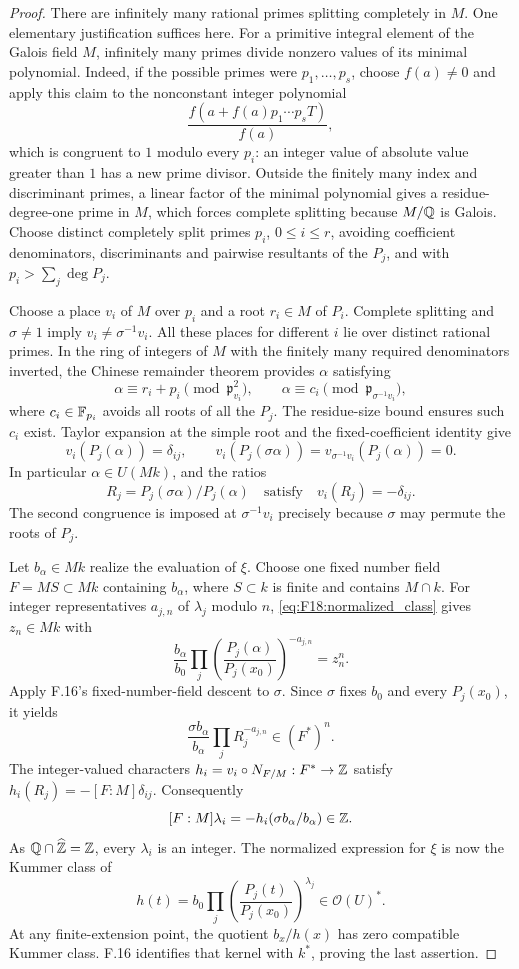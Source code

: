 \begin{proof}
There are infinitely many rational primes splitting completely
in $M$. One elementary justification suffices here. For a primitive
integral element of the Galois field $M$, infinitely many primes
divide nonzero values of its minimal polynomial. Indeed, if the
possible primes were $p_1,\ldots,p_s$, choose $f(a)\ne0$ and
apply this claim to the nonconstant integer polynomial
\[
 \frac{f(a+f(a)p_1\cdots p_s T)}{f(a)},
\]
which is congruent to $1$ modulo every $p_i$: an integer value of
absolute value greater than $1$ has a new prime divisor. Outside
the finitely many index and discriminant primes, a linear factor
of the minimal polynomial gives a residue-degree-one prime in
$M$, which forces complete splitting because $M/\mathbb Q$ is Galois.
Choose distinct completely split primes $p_i$, $0\le i\le r$,
avoiding coefficient denominators, discriminants and pairwise
resultants of the $P_j$, and with $p_i>\sum_j\deg P_j$.

Choose a place $v_i$ of $M$ over $p_i$ and a root $r_i\in M$
of $P_i$. Complete splitting and $\sigma\ne1$ imply
$v_i\ne\sigma^{-1}v_i$. All these places for different $i$
lie over distinct rational primes. In the ring of integers of
$M$ with the finitely many required denominators inverted, the
Chinese remainder theorem provides $\alpha$ satisfying
\[
 \alpha\equiv r_i+p_i\pmod{\mathfrak p_{v_i}^2},
 \qquad
 \alpha\equiv c_i\pmod{\mathfrak p_{\sigma^{-1}v_i}},
\]
where $c_i\in\mathbb F_{p_i}$ avoids all roots of all the $P_j$.
The residue-size bound ensures such $c_i$ exist. Taylor expansion
at the simple root and the fixed-coefficient identity give
\[
 v_i(P_j(\alpha))=\delta_{ij},\qquad
 v_i(P_j(\sigma\alpha))
 =v_{\sigma^{-1}v_i}(P_j(\alpha))=0.
\]
In particular $\alpha\in U(Mk)$, and the ratios
\[
 R_j=P_j(\sigma\alpha)/P_j(\alpha)
 \quad\text{satisfy}\quad v_i(R_j)=-\delta_{ij}.
\]
The second congruence is imposed at $\sigma^{-1}v_i$ precisely
because $\sigma$ may permute the roots of $P_j$.

Let $b_\alpha\in Mk$ realize the evaluation of $\xi$. Choose
one fixed number field $F=MS\subset Mk$ containing $b_\alpha$,
where $S\subset k$ is finite and contains $M\cap k$.
For integer representatives $a_{j,n}$ of $\lambda_j$ modulo $n$,
\eqref{eq:F18:normalized_class} gives $z_n\in Mk$ with
\[
 \frac{b_\alpha}{b_0}
 \prod_j\left(\frac{P_j(\alpha)}{P_j(x_0)}\right)^{-a_{j,n}}
 =z_n^n.
\]
Apply F.16's fixed-number-field descent to $\sigma$. Since
$\sigma$ fixes $b_0$ and every $P_j(x_0)$, it yields
\[
 \frac{\sigma b_\alpha}{b_\alpha}
       \prod_jR_j^{-a_{j,n}}\in(F^*)^n.
\]
The integer-valued characters
$h_i=v_i\circ N_{F/M}:F^*\to\mathbb Z$ satisfy
$h_i(R_j)=-[F:M]\delta_{ij}$. Consequently
\[
 [F:M]\lambda_i=-h_i(\sigma b_\alpha/b_\alpha)\in\mathbb Z.
\]
As $\mathbb Q\cap\widehat{\mathbb Z}=\mathbb Z$, every $\lambda_i$ is an integer.
The normalized expression for $\xi$ is now the Kummer class of
\[
 h(t)=b_0\prod_j\left(\frac{P_j(t)}{P_j(x_0)}\right)^{\lambda_j}
       \in\mathcal O(U)^*.
\]
At any finite-extension point, the quotient $b_x/h(x)$ has zero
compatible Kummer class. F.16 identifies that kernel with $k^*$,
proving the last assertion.
\end{proof}

